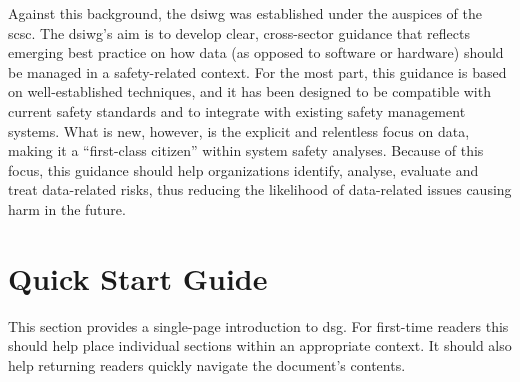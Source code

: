 Against this background, the \gls{dsiwg} was established under the auspices of the \gls{scsc}. The \gls{dsiwg}'s aim is to develop clear, cross-sector guidance that reflects emerging best practice on how data (as opposed to software or hardware) should be managed in a safety-related context.
For the most part, this guidance is based on well-established techniques,
and it has been designed to be compatible with current safety standards and to integrate with existing safety management systems.
What is new, however, is the explicit and relentless focus on data, making it a ``first-class citizen'' within system safety analyses.
Because of this focus, this guidance should help organizations identify, analyse, evaluate and treat data-related risks, thus reducing the likelihood of data-related issues causing harm in the future.

\clearpage
\section*{Quick Start Guide}
\pagestyle{ContinuationPageFrontMatter}


This section provides a single-page introduction to \gls{dsg}. For first-time readers this should help place individual sections within an appropriate context. It should also help returning readers quickly navigate the document's contents.

